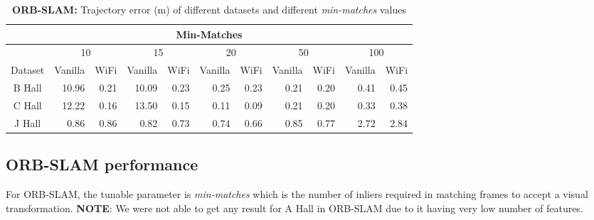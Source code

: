 \begin{table}
\caption{{\bf ORB-SLAM:} Trajectory error (m) of different datasets and different {\it min-matches} values}
\begin{center}
\begin{tabular}{| c | r r | r r | r r | r r | r r |} 
\hline 
\multicolumn{11}{|c|}{{Min-Matches}} \\ 
\hline 
 & \multicolumn{2}{|c|}{10} & \multicolumn{2}{|c|}{15} & \multicolumn{2}{|c|}{20} & \multicolumn{2}{|c|}{50} & \multicolumn{2}{|c|}{100} \\ 
\hline 
 {Dataset} & \multicolumn{1}{|c|}{Vanilla} & \multicolumn{1}{|c|}{WiFi} & \multicolumn{1}{|c|}{Vanilla} & \multicolumn{1}{|c|}{WiFi} & \multicolumn{1}{|c|}{Vanilla} & \multicolumn{1}{|c|}{WiFi} & \multicolumn{1}{|c|}{Vanilla} & \multicolumn{1}{|c|}{WiFi} & \multicolumn{1}{|c|}{Vanilla} & \multicolumn{1}{|c|}{WiFi} \\ 
\hline 
 B Hall & 10.96 & 0.21 & 10.09 & 0.23 & 0.25 & 0.23 & 0.21 & 0.20 & 0.41 & 0.45 \\ 
 C Hall & 12.22 & 0.16 & 13.50 & 0.15 & 0.11 & 0.09 & 0.21 & 0.20 & 0.33 & 0.38 \\ 
 J Hall & 0.86 & 0.86 & 0.82 & 0.73 & 0.74 & 0.66 & 0.85 & 0.77 & 2.72 & 2.84 \\ 
 \hline 
 \end{tabular}
\label{table:orbslam_rmse}
\end{center}
\end{table}
\subsection{ORB-SLAM performance}

For ORB-SLAM, the tunable parameter is {\it min-matches} which is the number of inliers required in matching frames to accept a visual transformation. 
{\bf NOTE}: We were not able to get any result for A Hall in ORB-SLAM due to it having very low number of features.

